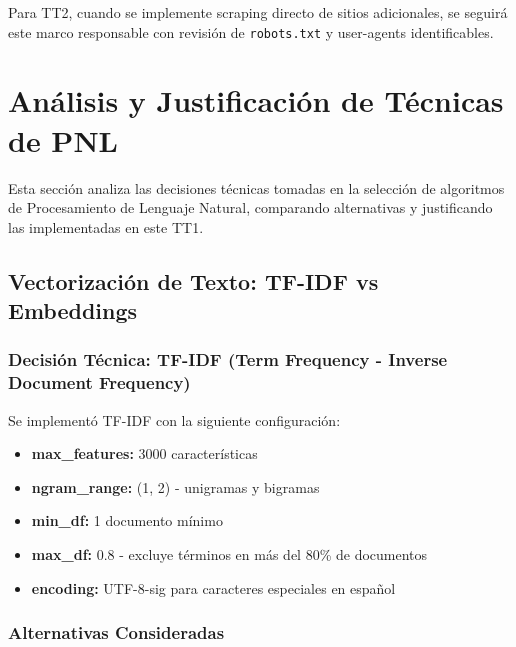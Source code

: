 Para TT2, cuando se implemente scraping directo de sitios adicionales, se seguirá este marco responsable con revisión de \texttt{robots.txt} y user-agents identificables.

\section{Análisis y Justificación de Técnicas de PNL}
\label{sec:tecnicas_pnl}

Esta sección analiza las decisiones técnicas tomadas en la selección de algoritmos de Procesamiento de Lenguaje Natural, comparando alternativas y justificando las implementadas en este TT1.

\subsection{Vectorización de Texto: TF-IDF vs Embeddings}
\label{subsec:vectorizacion}

\subsubsection{Decisión Técnica: TF-IDF (Term Frequency - Inverse Document Frequency)}
\label{subsubsec:tfidf_decision}

Se implementó TF-IDF con la siguiente configuración:
\begin{itemize}
    \item \textbf{max\_features:} 3000 características
    \item \textbf{ngram\_range:} (1, 2) - unigramas y bigramas
    \item \textbf{min\_df:} 1 documento mínimo
    \item \textbf{max\_df:} 0.8 - excluye términos en más del 80\% de documentos
    \item \textbf{encoding:} UTF-8-sig para caracteres especiales en español
\end{itemize}

\subsubsection{Alternativas Consideradas}
\label{subsubsec:alternativas_vectorizacion}

